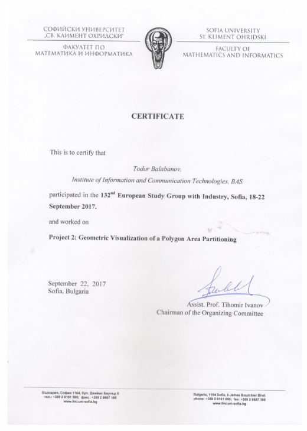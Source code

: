 \documentclass[bulgarian,a4paper]{europasscv}
\begin{document}
\includegraphics[width=\textwidth,height=\textheight,keepaspectratio]{ESGI1322017}
\end{document}
